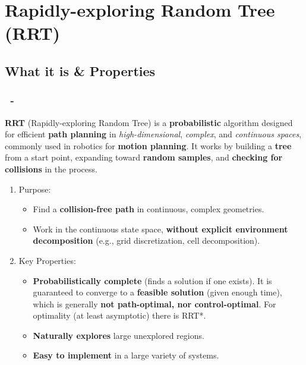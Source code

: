 \documentclass{beamer}
\begin{document}

\section{Rapidly-exploring Random Tree (RRT)}

\subsection{What it is \& Properties}
\begin{frame}
    \frametitle{\insertsection \ - \insertsubsection}
    \textbf{RRT} (Rapidly-exploring Random Tree) is a \textbf{probabilistic} algorithm designed for efficient \textbf{path planning} in \textit{high-dimensional}, \textit{complex}, and \textit{continuous spaces}, commonly used in robotics for \textbf{motion planning}. It works by building a \textbf{tree} from a start point, expanding toward \textbf{random samples}, and \textbf{checking for collisions} in the process.
    \vspace{5pt}
    \begin{enumerate}
        \item Purpose:
              \begin{itemize}
                  \item Find a \textbf{collision-free path} in continuous, complex geometries.
                  \item Work in the continuous state space, \textbf{without explicit environment decomposition} (e.g., grid discretization, cell decomposition).
              \end{itemize}
        \item Key Properties:
              \begin{itemize}
                  \item \textbf{Probabilistically complete} (finds a solution if one exists). It is guaranteed to converge to a \textbf{feasible solution} (given enough time), which is generally \textbf{not path-optimal, nor control-optimal}. For optimality (at least asymptotic) there is RRT*.
                  \item \textbf{Naturally explores} large unexplored regions.
                  \item \textbf{Easy to implement} in a large variety of systems.
              \end{itemize}
    \end{enumerate}
\end{frame}
\end{document}

